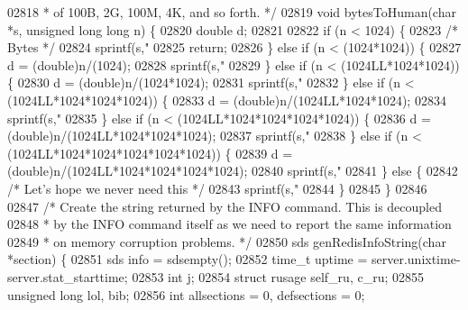 \begin{DoxyCode}
{{{{{{{{{{{{{{{{{{{{{{{{{{{{{{{{{{02818 \textcolor{comment}{ * of 100B, 2G, 100M, 4K, and so forth. */}
02819 \textcolor{keywordtype}{void} bytesToHuman(\textcolor{keywordtype}{char} *s, \textcolor{keywordtype}{unsigned} \textcolor{keywordtype}{long} \textcolor{keywordtype}{long} n) \{
02820     \textcolor{keywordtype}{double} d;
02821 
02822     \textcolor{keywordflow}{if} (n < 1024) \{
02823         \textcolor{comment}{/* Bytes */}
02824         sprintf(s,\textcolor{stringliteral}{"%
02825         \textcolor{keywordflow}{return};
02826     \} \textcolor{keywordflow}{else} \textcolor{keywordflow}{if} (n < (1024*1024)) \{
02827         d = (\textcolor{keywordtype}{double})n/(1024);
02828         sprintf(s,\textcolor{stringliteral}{"%
02829     \} \textcolor{keywordflow}{else} \textcolor{keywordflow}{if} (n < (1024LL*1024*1024)) \{
02830         d = (\textcolor{keywordtype}{double})n/(1024*1024);
02831         sprintf(s,\textcolor{stringliteral}{"%
02832     \} \textcolor{keywordflow}{else} \textcolor{keywordflow}{if} (n < (1024LL*1024*1024*1024)) \{
02833         d = (\textcolor{keywordtype}{double})n/(1024LL*1024*1024);
02834         sprintf(s,\textcolor{stringliteral}{"%
02835     \} \textcolor{keywordflow}{else} \textcolor{keywordflow}{if} (n < (1024LL*1024*1024*1024*1024)) \{
02836         d = (\textcolor{keywordtype}{double})n/(1024LL*1024*1024*1024);
02837         sprintf(s,\textcolor{stringliteral}{"%
02838     \} \textcolor{keywordflow}{else} \textcolor{keywordflow}{if} (n < (1024LL*1024*1024*1024*1024*1024)) \{
02839         d = (\textcolor{keywordtype}{double})n/(1024LL*1024*1024*1024*1024);
02840         sprintf(s,\textcolor{stringliteral}{"%
02841     \} \textcolor{keywordflow}{else} \{
02842         \textcolor{comment}{/* Let's hope we never need this */}
02843         sprintf(s,\textcolor{stringliteral}{"%
02844     \}
02845 \}
02846 
02847 \textcolor{comment}{/* Create the string returned by the INFO command. This is decoupled}
02848 \textcolor{comment}{ * by the INFO command itself as we need to report the same information}
02849 \textcolor{comment}{ * on memory corruption problems. */}
02850 sds genRedisInfoString(\textcolor{keywordtype}{char} *section) \{
02851     sds info = sdsempty();
02852     time\_t uptime = server.unixtime-server.stat\_starttime;
02853     \textcolor{keywordtype}{int} j;
02854     \textcolor{keyword}{struct} rusage self\_ru, c\_ru;
02855     \textcolor{keywordtype}{unsigned} \textcolor{keywordtype}{long} lol, bib;
02856     \textcolor{keywordtype}{int} allsections = 0, defsections = 0;
}}}}}}}}}}}}}}}}}}}}}}}}}}}}}}}}}}}}}}}}}
\end{DoxyCode}
